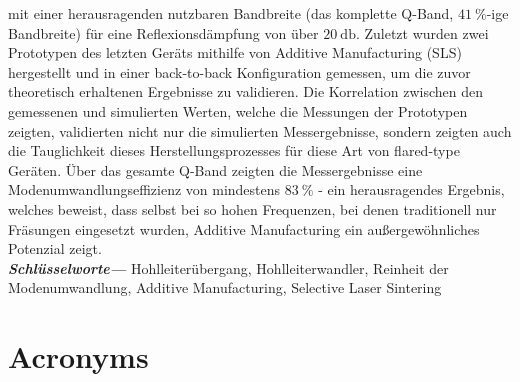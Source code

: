\documentclass[english,twoside]{article}
\providecommand{\keywordsde}[1]
{
  {\small	
  \textbf{\textit{Schlüsselworte---}} #1}
}
\begin{document}
mit einer herausragenden nutzbaren Bandbreite (das komplette Q-Band, $\SI{41}{\percent}$-ige Bandbreite) für eine Reflexionsdämpfung von über $\SI{20}{\decibel}$. Zuletzt wurden zwei Prototypen des letzten Geräts mithilfe von Additive Manufacturing (\ac{SLS}) hergestellt und in einer back-to-back Konfiguration gemessen, um die zuvor theoretisch erhaltenen Ergebnisse zu validieren. Die Korrelation zwischen den gemessenen und simulierten Werten, welche die Messungen der Prototypen zeigten, validierten nicht nur die simulierten Messergebnisse, sondern zeigten auch die Tauglichkeit dieses Herstellungsprozesses für diese Art von flared-type Geräten. Über das gesamte Q-Band zeigten die Messergebnisse eine Modenumwandlungseffizienz von mindestens $\SI{83}{\percent}$ - ein herausragendes Ergebnis, welches beweist, dass selbst bei so hohen Frequenzen, bei denen traditionell nur Fräsungen eingesetzt wurden, Additive Manufacturing ein außergewöhnliches Potenzial zeigt.\\
		
	\keywordsde{Hohlleiterübergang, Hohlleiterwandler, Reinheit der Modenumwandlung, Additive Manufacturing, Selective Laser Sintering}
		
	\newpage
	
	\tableofcontents
	\newpage
	\listoffigures
	\listoftables


	\newpage
	\section*{Acronyms}
	
	\begin{acronym}
   	\end{acronym}

	\newpage {}
	
\end{document}

